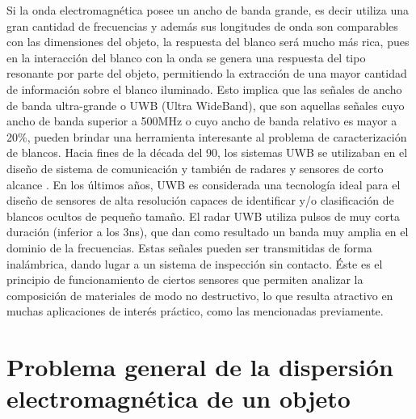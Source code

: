 Si la onda electromagnética posee un ancho de banda grande, es decir utiliza una gran cantidad de frecuencias y además sus longitudes de onda son comparables con las dimensiones del objeto, la respuesta del blanco será mucho más rica, pues en la interacción del blanco con la onda se genera una respuesta del tipo resonante por parte del objeto, permitiendo la extracción de una mayor cantidad de información sobre el blanco iluminado. Esto implica que las señales de ancho de banda ultra-grande o UWB (Ultra WideBand), que son aquellas señales cuyo ancho de banda superior a 500MHz o cuyo ancho de banda relativo es mayor a 20\%, pueden brindar una herramienta interesante al problema de caracterización de blancos. Hacia fines de la década del 90, los sistemas UWB se utilizaban en el diseño de sistema de comunicación y también de radares y sensores de corto alcance \cite{Cuomo1999, Taylor1995}. En los últimos años, UWB es considerada una tecnología ideal para el diseño de sensores de alta resolución capaces de identificar y/o clasificación de blancos ocultos de pequeño tamaño. El radar UWB utiliza pulsos de muy corta duración (inferior a los 3ns), que dan como resultado un banda muy amplia en el dominio de la frecuencias. Estas señales pueden ser transmitidas de forma inalámbrica, dando lugar a un sistema de inspección sin contacto. Éste es el principio de funcionamiento de ciertos sensores que permiten analizar la composición de materiales de modo no destructivo, lo que resulta atractivo en muchas aplicaciones de interés práctico, como las mencionadas previamente. 

\section{Problema general de la dispersión electromagnética de un objeto}

